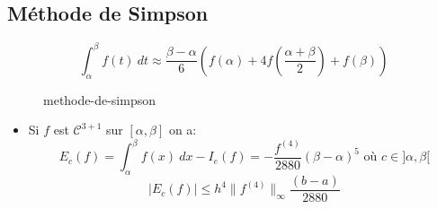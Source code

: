 \subsection{Méthode de Simpson}
\begin{definition}
    \[
    \int_{{\alpha}}^{{\beta}} {f(t)} \: d{t} \approx \frac{\beta - \alpha}{6}\left( f(\alpha) + 4f(\frac{\alpha + \beta}{2}) + f(\beta) \right) 
    \] 
\begin{figure}[H]
    \centering
    \caption{methode-de-simpson}
    \label{fig:methode-de-simpson}
\end{figure}
\end{definition}
\begin{prop}
    \begin{itemize}
        \item Si $f$ est  $\mathcal{C}^{3 + 1}$ sur  $[\alpha, \beta]$ on a:
             \[
                 E_c(f) = \int_{{\alpha}}^{{\beta}} {f(x)} \: d{x} - I_e(f) = -\frac{f^{(4)}}{2880}(\beta - \alpha)^5 \text{ où } c \in ]\alpha, \beta[
            \] 
            \[
                \left| E_c(f) \right| \le h^{4} \|f^{(4)}\|_{\infty} \frac{(b-a)}{2880}
            \] 
    \end{itemize}
\end{prop}
